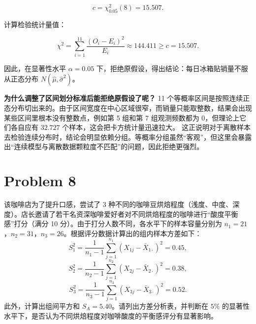 \documentclass[12pt,a4paper]{article}
\begin{document}
\begin{answerbox}
$$
c = \chi^2_{0.05}(8)=15.507.
$$

计算检验统计量值：

$$
\chi^2=\sum_{i=1}^{11}\frac{(O_i-E_i)^2}{E_i}
\approx 144.411 \geq c = 15.507.
$$

因此，在显著性水平 $\alpha=0.05$ 下，拒绝原假设，得出结论：每日冰箱贴销量不服从正态分布 $N(\hat\mu, \hat\sigma^2)$。

\vspace{0.5em}

\textbf{为什么调整了区间划分标准后能拒绝原假设了呢？} 11 个等概率区间是按照连续正态分布切出来的。由于区间宽度在中心区域很窄，而销量只能取整数，结果会出现某些区间里根本没有整数点，例如第 5 组和第 7 组观测频数都为 0，但理论上它们各自应有 $32.727$ 个样本，这会把卡方统计量迅速拉大。
这正说明对于离散样本去检验连续分布时，结论会明显依赖分组。等概率分组虽然“客观”，但这里会暴露出“连续模型与离散数据颗粒度不匹配”的问题，因此拒绝更强烈。

\end{answerbox}

\section{Problem 8}

该咖啡店为了提升口感，尝试了 3 种不同的咖啡豆烘焙程度（浅度、中度、深度）。店长邀请了若干名资深咖啡爱好者对不同烘焙程度的咖啡进行“酸度平衡感”打分（满分 10 分）。由于打分人数不同，各水平下的样本容量分别为 $n_1=21$，$n_2=31$，$n_3=26$。根据评分数据计算出的组内样本方差如下：
\[
S_1^2=\frac{1}{n_1-1}\sum_{j=1}^{n_1}(X_{1j}-\bar X_{1\cdot})^2=0.45,
\]
\[
S_2^2=\frac{1}{n_2-1}\sum_{j=1}^{n_2}(X_{2j}-\bar X_{2\cdot})^2=0.38,
\]
\[
S_3^2=\frac{1}{n_3-1}\sum_{j=1}^{n_3}(X_{3j}-\bar X_{3\cdot})^2=0.52.
\]
此外，计算出组间平方和 $S_A=5.40$。请列出方差分析表，并判断在 $5\%$ 的显著性水平下，是否认为不同烘焙程度对咖啡酸度的平衡感评分有显著影响。
\end{document}
